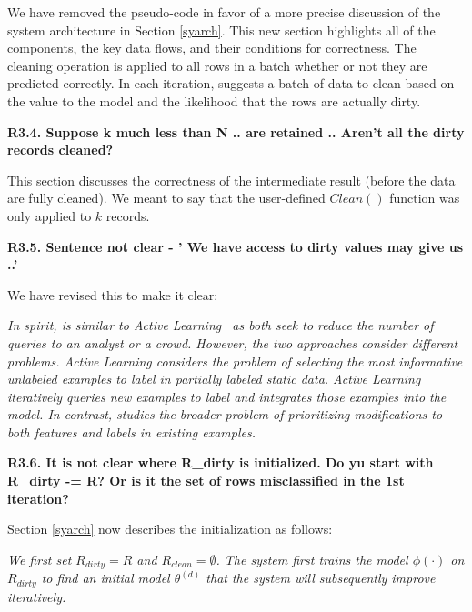 \noindent  We have removed the pseudo-code in favor of a more precise discussion of the system architecture in Section \ref{syarch}. This new section highlights all of the components, the key data flows, and their conditions for correctness. 
The cleaning operation is applied to all rows in a batch whether or not they are predicted correctly.
In each iteration, \sys suggests a batch of data to clean based on the value to the model and the likelihood that the rows are actually dirty.

\vspace{0.5em}

\noindent \textbf{R3.4. Suppose k much less than N .. are retained .. Aren't all
the dirty records cleaned?}

\noindent This section discusses the correctness of the intermediate result (before the data are fully cleaned).
We meant to say that the user-defined $Clean()$ function was only applied to $k$ records.

\vspace{0.5em}

\noindent\textbf{R3.5. Sentence not clear - ' We have access to dirty
values may give us ..'}

 \noindent We have revised this to make it clear:

\emph{In spirit, \sys is similar to Active Learning~\cite{DBLP:journals/pvldb/YakoutENOI11,gokhale2014corleone} as both seek to reduce the number of queries to an analyst or a crowd.
However, the two approaches consider different problems.
Active Learning considers the problem of selecting the most informative unlabeled examples to label in partially labeled static data.
Active Learning iteratively queries new examples to label and integrates those examples into the model.
In contrast, \sys studies the broader problem of prioritizing modifications to both features and labels in existing examples.} 

\vspace{0.5em}

\noindent\textbf{R3.6. It is not clear where R\_dirty is initialized. Do yu start with R\_dirty -= R? Or is it the set of rows misclassified in the 1st iteration?}

\noindent Section \ref{syarch} now describes the initialization as follows:

\emph{We first set $R_{dirty} = R$ and $R_{clean} = \emptyset$.
The system first trains the model $\phi(\cdot)$ on $R_{dirty}$ to find an initial model $\theta^{(d)}$ that the system will subsequently improve iteratively.}

